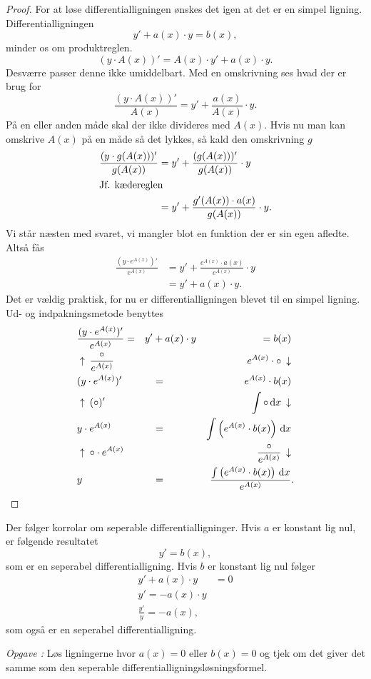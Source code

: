 \documentclass{article}
\newcounter{opgavecnt}
\newcommand{\opg}[1]{\stepcounter{opgavecnt}\textit{Opgave \arabic{opgavecnt}: }#1}
\begin{document}
\begin{proof}
    For at løse differentialligningen ønskes det igen at det er en simpel
    ligning. Differentialligningen
    \[
        y' + a(x) \cdot y = b(x),
    \] 
    minder os om produktreglen.
    \[
        (y \cdot A(x))' = A(x) \cdot y' + a(x) \cdot y.
    \] 
    Desværre passer denne ikke umiddelbart. Med en omskrivning ses hvad der er
    brug for
    \[
        \frac{(y \cdot A(x))'}{A(x)} = y' + \frac{a(x)}{A(x)} \cdot y.
    \] 
    På en eller anden måde skal der ikke divideres med $A(x)$. Hvis nu man kan
    omskrive $A(x)$ på en måde så det lykkes, så kald den omskrivning $g$
    \begin{align*}
        \frac{(y \cdot g(A(x)))'}{g(A(x))} &= y' + \frac{(g(A(x)))'}{g(A(x))} \cdot y\\
        \intertext{Jf. kædereglen}
                                           &= y' + \frac{g'(A(x)) \cdot a(x)}{g(A(x))} \cdot y.
    \end{align*}
    Vi står næsten med svaret, vi mangler blot en funktion der er sin egen
    afledte. Altså fås
    \begin{align*}
        \frac{(y \cdot e^{A(x)})'}{e^{A(x)}} &= y' + \frac{e^{A(x)} \cdot a(x)}{e^{A(x)}} \cdot y\\
                                             &= y' + a(x) \cdot y.
    \end{align*}
    Det er vældig praktisk, for nu er differentialligningen blevet til en
    simpel ligning. Ud- og indpakningsmetode benyttes
    \begin{align*}
        &\frac{(y \cdot e^{A(x)})'}{e^{A(x)}} =& y' &+ a(x) \cdot y &= b(x)&\\
        &\uparrow\: \frac{\circ}{e^{A(x)}} &&& e^{A(x)} \cdot \circ \: \downarrow&\\
        &(y \cdot e^{A(x)})' &&=& e^{A(x)} \cdot b(x)&\\
        &\uparrow\: ( \circ )' &&& \int \circ \,\mathrm{d} x \: \downarrow&\\
        &y \cdot e^{A(x)} &&=& \int \left(e^{A(x)} \cdot b(x)\right) \,\mathrm{d} x&\\
        &\uparrow\: \circ \cdot e^{A(x)} &&& \frac{\circ}{e^{A(x)}} \: \downarrow&\\
        &y &&=& \frac{\int \left(e^{A(x)} \cdot b(x)\right) \,\mathrm{d} x}{e^{A(x)}}&.\qedhere
    \end{align*}
\end{proof}

Der følger korrolar om seperable differentialligninger. Hvis $a$ er konstant
lig nul, er følgende resultatet
\[
    y' = b(x),
\] 
som er en seperabel differentialligning. Hvis $b$ er konstant lig nul følger
\begin{align*}
    y' + a(x) \cdot y &= 0\\
    y' = -a(x) \cdot y\\
    \frac{y'}{y} = -a(x),
\end{align*}
som også er en seperabel differentialligning.

\opg{Løs ligningerne hvor $a(x) = 0$ eller $b(x) = 0$ og tjek om det giver det
samme som den seperable differentialligningsløsningsformel.}

\printindex
\end{document}
